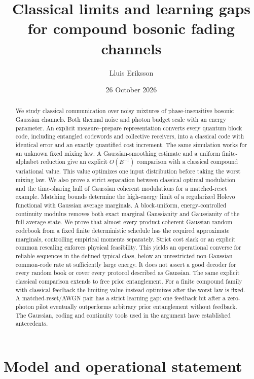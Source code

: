 \documentclass[11pt]{article}
\title{Classical limits and learning gaps\newline
for compound bosonic fading channels}
\author{Lluis Eriksson}
\date{26 October 2026}
\begin{document}
\maketitle
\begin{abstract}
We study classical communication over noisy mixtures of
phase-insensitive bosonic Gaussian channels. Both thermal noise
and photon budget scale with an energy parameter. An explicit
measure--prepare representation converts every quantum block code,
including entangled codewords and collective receivers, into a classical
code with identical error and an exactly quantified cost increment.
The same simulation works for an unknown fixed mixing law.
A Gaussian-smoothing estimate and a uniform finite-alphabet reduction
give an explicit \(O(E^{-1})\) comparison with a classical compound
variational value. This value optimizes one input distribution before
taking the worst mixing law. We also prove a strict separation
between classical optimal modulation and the time-sharing hull of Gaussian
coherent modulations for a matched-reset example. Matching bounds determine the high-energy limit of a regularized
Holevo functional with Gaussian average marginals. A block-uniform,
energy-controlled continuity modulus removes both exact marginal
Gaussianity and Gaussianity of the full average state. We prove that
almost every product coherent Gaussian random codebook from a fixed
finite deterministic schedule has the required approximate marginals,
controlling empirical moments separately. Strict cost slack or an
explicit common rescaling enforces physical feasibility. This yields
an operational converse for reliable sequences in the defined typical
class, below an unrestricted non-Gaussian common-code rate at sufficiently
large energy. It does not assert a good decoder for every random book
or cover every protocol described as Gaussian. The same explicit classical
comparison extends to free prior entanglement. For a finite compound
family with classical feedback the limiting value instead optimizes
after the worst law is fixed. A matched-reset/AWGN pair has a strict
learning gap: one feedback bit after a zero-photon pilot eventually
outperforms arbitrary prior entanglement without feedback. The Gaussian, coding and
continuity tools used in the argument have established antecedents.
\end{abstract}

\section{Model and operational statement}
\end{document}

